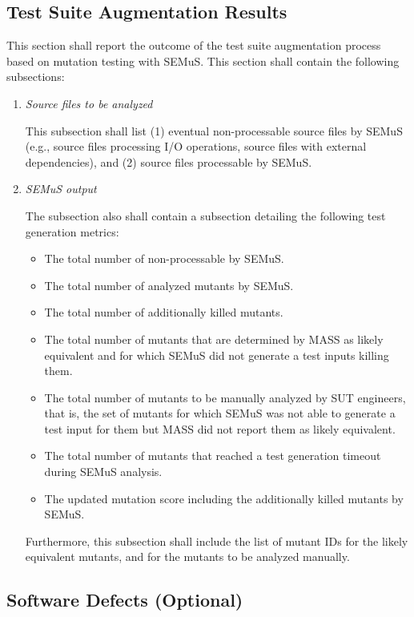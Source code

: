 \subsection{Test Suite Augmentation Results}

This section shall report the outcome of the test suite augmentation process based on mutation testing with SEMuS. This section shall contain the following subsections:

\begin{enumerate}
    \item \emph{Source files to be analyzed}

    This subsection shall list (1) eventual non-processable source files by SEMuS (e.g., source files processing I/O operations, source files with external dependencies), and (2) source files processable by SEMuS.

    \item \emph{SEMuS output}

    The subsection also shall contain a subsection detailing the following test generation metrics:
    \begin{itemize}
        \item The total number of non-processable by SEMuS.
        \item The total number of analyzed mutants by SEMuS.
        \item The total number of additionally killed mutants.
        \item The total number of mutants that are determined by MASS as likely equivalent and for which SEMuS did not generate a test inputs killing them.
        \item The total number of mutants to be manually analyzed by SUT engineers, that is, the set of mutants for which SEMuS was not able to generate a test input for them but MASS did not report them as likely equivalent.
        \item The total number of mutants that reached a test generation timeout during SEMuS analysis.
        \item The updated mutation score including the additionally killed mutants by SEMuS.
    \end{itemize}

    Furthermore, this subsection shall include the list of mutant IDs for the likely equivalent mutants, and for the mutants to be analyzed manually.
\end{enumerate}



\subsection{Software Defects (Optional)}

